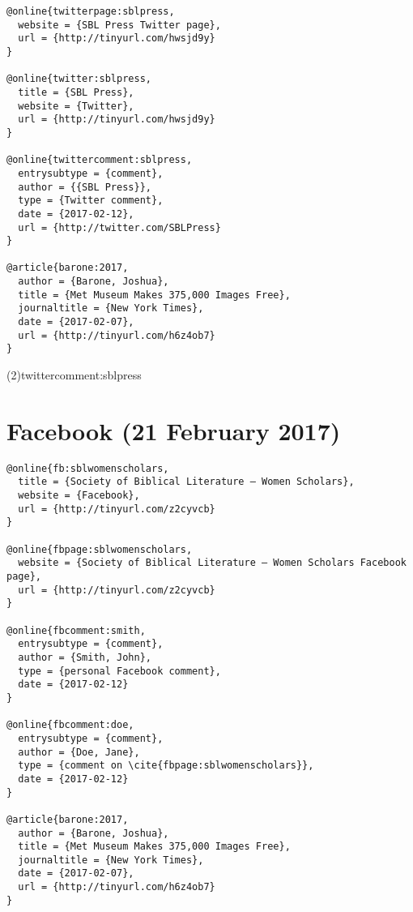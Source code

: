 \documentclass[a4paper]{article}
\renewcommand\footnote[1]{##1}%
\begin{document}
\begin{verbatim}
@online{twitterpage:sblpress,
  website = {SBL Press Twitter page},
  url = {http://tinyurl.com/hwsjd9y}
}

@online{twitter:sblpress,
  title = {SBL Press},
  website = {Twitter},
  url = {http://tinyurl.com/hwsjd9y}
}

@online{twittercomment:sblpress,
  entrysubtype = {comment},
  author = {{SBL Press}},
  type = {Twitter comment},
  date = {2017-02-12},
  url = {http://twitter.com/SBLPress}
}

@article{barone:2017,
  author = {Barone, Joshua},
  title = {Met Museum Makes 375,000 Images Free},
  journaltitle = {New York Times},
  date = {2017-02-07},
  url = {http://tinyurl.com/h6z4ob7}
}
\end{verbatim}

\examplecite(2){twittercomment:sblpress}
\examplebibliography
{}

\section{Facebook (21 February 2017)}

\begin{verbatim}
@online{fb:sblwomenscholars,
  title = {Society of Biblical Literature – Women Scholars},
  website = {Facebook},
  url = {http://tinyurl.com/z2cyvcb}
}

@online{fbpage:sblwomenscholars,
  website = {Society of Biblical Literature – Women Scholars Facebook page},
  url = {http://tinyurl.com/z2cyvcb}
}

@online{fbcomment:smith,
  entrysubtype = {comment},
  author = {Smith, John},
  type = {personal Facebook comment},
  date = {2017-02-12}
}

@online{fbcomment:doe,
  entrysubtype = {comment},
  author = {Doe, Jane},
  type = {comment on \cite{fbpage:sblwomenscholars}},
  date = {2017-02-12}
}

@article{barone:2017,
  author = {Barone, Joshua},
  title = {Met Museum Makes 375,000 Images Free},
  journaltitle = {New York Times},
  date = {2017-02-07},
  url = {http://tinyurl.com/h6z4ob7}
}
\end{verbatim}
\end{document}
